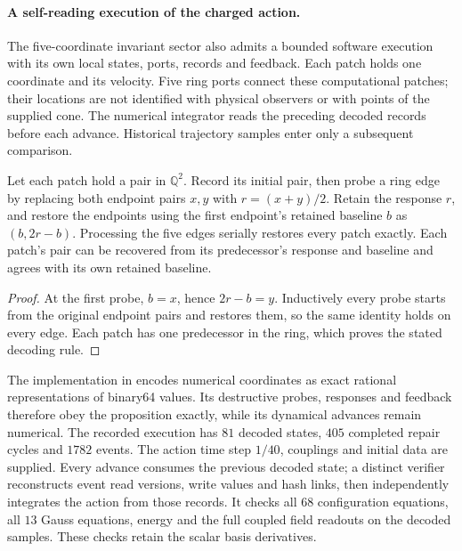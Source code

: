 \paragraph{A self-reading execution of the charged action.}
The five-coordinate invariant sector also admits a bounded software
execution with its own local states, ports, records and feedback. Each
patch holds one coordinate and its velocity. Five ring ports connect these
computational patches; their locations are not identified with physical
observers or with points of the supplied cone. The numerical integrator
reads the preceding decoded records before each advance. Historical
trajectory samples enter only a subsequent comparison.

\begin{proposition}
\label{prop:whitney-charged-record-restoration}
Let each patch hold a pair in \(\mathbb Q^2\). Record its initial pair,
then probe a ring edge by replacing both endpoint pairs \(x,y\) with
\(r=(x+y)/2\). Retain the response \(r\), and restore the endpoints
using the first endpoint's retained baseline \(b\) as
\((b,2r-b)\). Processing the five edges serially restores every patch
exactly. Each patch's pair can be recovered from its predecessor's
response and baseline and agrees with its own retained baseline.
\end{proposition}
\begin{proof}
At the first probe, \(b=x\), hence \(2r-b=y\).
Inductively every probe starts from the original endpoint pairs and
restores them, so the same identity holds on every edge. Each patch has
one predecessor in the ring, which proves the stated decoding rule.
\end{proof}

The implementation in
encodes numerical coordinates as exact rational representations of
binary64 values. Its destructive probes, responses and feedback therefore
obey the proposition exactly, while its dynamical advances remain numerical.
The recorded execution has \(81\) decoded states, \(405\) completed
repair cycles and \(1782\) events. The action time step \(1/40\),
couplings and initial data are supplied. Every advance consumes the
previous decoded state; a distinct verifier reconstructs event read
versions, write values and hash links, then independently integrates the
action from those records. It checks all \(68\) configuration equations,
all \(13\) Gauss equations, energy and the full coupled field readouts
on the decoded samples. These checks retain the scalar basis derivatives.

